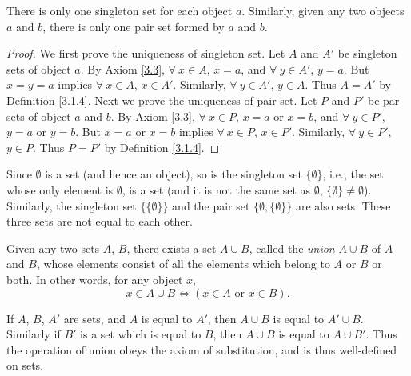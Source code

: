 \begin{corollary}\label{3.1.9}
There is only one singleton set for each object \(a\).
Similarly, given any two objects \(a\) and \(b\), there is only one pair set formed by \(a\) and \(b\).
\end{corollary}

\begin{proof}
We first prove the uniqueness of singleton set.
Let \(A\) and \(A'\) be singleton sets of object \(a\).
By Axiom \ref{3.3}, \(\forall\ x \in A\), \(x = a\), and \(\forall\ y \in A'\), \(y = a\).
But \(x = y = a\) implies \(\forall\ x \in A\), \(x \in A'\).
Similarly, \(\forall\ y \in A'\), \(y \in A\).
Thus \(A = A'\) by Definition \ref{3.1.4}.
Next we prove the uniqueness of pair set.
Let \(P\) and \(P'\) be par sets of object \(a\) and \(b\).
By Axiom \ref{3.3}, \(\forall\ x \in P\), \(x = a\) or \(x = b\), and \(\forall\ y \in P'\), \(y = a\) or \(y = b\).
But \(x = a\) or \(x = b\) implies \(\forall\ x \in P\), \(x \in P'\).
Similarly, \(\forall\ y \in P'\), \(y \in P\).
Thus \(P = P'\) by Definition \ref{3.1.4}.
\end{proof}

\begin{remark}\label{3.1.10}
Since \(\emptyset\) is a set (and hence an object), so is the singleton set \(\{\emptyset\}\), i.e., the set whose only element is \(\emptyset\), is a set (and it is not the same set as \(\emptyset\), \(\{\emptyset\} \neq \emptyset\)).
Similarly, the singleton set \(\{\{\emptyset\}\}\) and the pair set \(\{\emptyset, \{\emptyset\}\}\) are also sets.
These three sets are not equal to each other.
\end{remark}

\begin{axiom}\label{3.4}
Given any two sets \(A\), \(B\), there exists a set \(A \cup B\), called the \emph{union} \(A \cup B\) of \(A\) and \(B\), whose elements consist of all the elements which belong to \(A\) or \(B\) or both.
In other words, for any object \(x\),
\[
    x \in A \cup B \iff (x \in A \text{ or } x \in B).
\]
\end{axiom}

\setcounter{theorem}{11}
\begin{remark}\label{3.1.12}
If \(A\), \(B\), \(A'\) are sets, and \(A\) is equal to \(A'\), then \(A \cup B\) is equal to \(A' \cup B\).
Similarly if \(B'\) is a set which is equal to \(B\), then \(A \cup B\) is equal to \(A \cup B'\).
Thus the operation of union obeys the axiom of substitution, and is thus well-defined on sets.
\end{remark}

